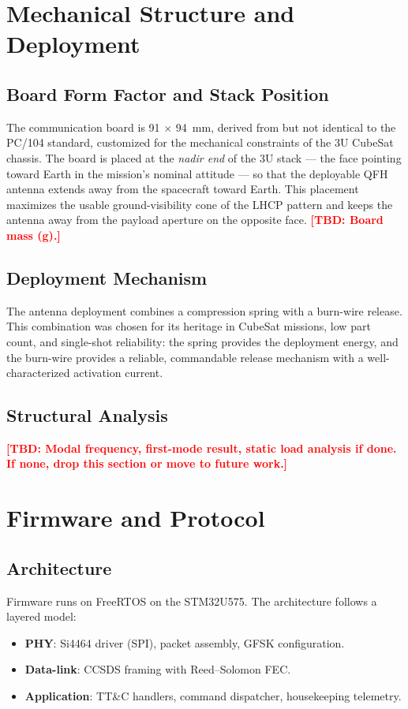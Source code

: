 \documentclass[conference]{IEEEtran}
\newcommand{\tbd}[1]{\textcolor{red}{\textbf{[TBD: #1]}}}
\begin{document}
\section{Mechanical Structure and Deployment}

\subsection{Board Form Factor and Stack Position}
The communication board is 91 $\times$ 94~mm, derived from but not identical to the PC/104 standard, customized for the mechanical constraints of the 3U CubeSat chassis. The board is placed at the \textit{nadir end} of the 3U stack --- the face pointing toward Earth in the mission's nominal attitude --- so that the deployable QFH antenna extends away from the spacecraft toward Earth. This placement maximizes the usable ground-visibility cone of the LHCP pattern and keeps the antenna away from the payload aperture on the opposite face. \tbd{Board mass (g).}

\subsection{Deployment Mechanism}
The antenna deployment combines a compression spring with a burn-wire release. This combination was chosen for its heritage in CubeSat missions, low part count, and single-shot reliability: the spring provides the deployment energy, and the burn-wire provides a reliable, commandable release mechanism with a well-characterized activation current.

\subsection{Structural Analysis}
\tbd{Modal frequency, first-mode result, static load analysis if done. If none, drop this section or move to future work.}

\section{Firmware and Protocol}

\subsection{Architecture}
Firmware runs on FreeRTOS on the STM32U575. The architecture follows a layered model:
\begin{itemize}
\item \textbf{PHY}: Si4464 driver (SPI), packet assembly, GFSK configuration.
\item \textbf{Data-link}: CCSDS framing with Reed--Solomon FEC.
\item \textbf{Application}: TT\&C handlers, command dispatcher, housekeeping telemetry.
\end{itemize}
\end{document}
